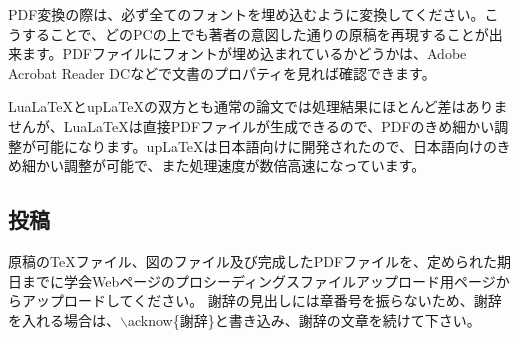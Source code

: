 \documentclass{PASJ2026}
\begin{document}
PDF変換の際は、必ず全てのフォントを埋め込むように変換してください。こうすることで、どのPCの上でも著者の意図した通りの原稿を再現することが出来ます。PDFファイルにフォントが埋め込まれているかどうかは、Adobe Acrobat Reader DCなどで文書のプロパティを見れば確認できます。

{Lua\LaTeX}と{up\LaTeX}の双方とも通常の論文では処理結果にほとんど差はありませんが、{Lua\LaTeX}は直接PDFファイルが生成できるので、PDFのきめ細かい調整が可能になります。{up\LaTeX}は日本語向けに開発されたので、日本語向けのきめ細かい調整が可能で、また処理速度が数倍高速になっています。

% 
\balance %

%
\subsection{投稿}
原稿の{\TeX}ファイル、図のファイル及び完成したPDFファイルを、定められた期日までに学会Webページのプロシーディングスファイルアップロード用ページからアップロードしてください。
%
謝辞の見出しには章番号を振らないため、謝辞を入れる場合は、$\backslash$acknow\{謝辞\}と書き込み、謝辞の文章を続けて下さい。
\end{document}
